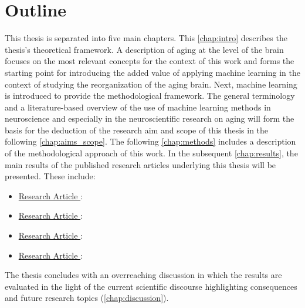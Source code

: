 \section{Outline}
This thesis is separated into five main chapters. This \autoref{chap:intro} describes the thesis's theoretical framework. A description of aging at the level of the brain focuses on the most relevant concepts for the context of this work and forms the starting point for introducing the added value of applying machine learning in the context of studying the reorganization of the aging brain. Next, machine learning is introduced to provide the methodological framework. The general terminology and a literature-based overview of the use of machine learning methods in neuroscience and especially in the neuroscientific research on aging will form the basis for the deduction of the research aim and scope of this thesis in the following \autoref{chap:aims_scope}. The following \autoref{chap:methods} includes a description of the methodological approach of this work. In the subsequent \autoref{chap:results}, the main results of the published research articles underlying this thesis will be presented. These include:

\begin{itemize}
\item \hyperref[paperI]{Research Article }:\\ 
\item \hyperref[paperII]{Research Article }:\\ 
\item \hyperref[paperIII]{Research Article }:\\ 
\item \hyperref[paperIV]{Research Article }:\\ 
\end{itemize}
\noindent The thesis concludes with an overreaching discussion in which the results are evaluated in the light of the current scientific discourse highlighting consequences and future research topics (\autoref{chap:discussion}). 
